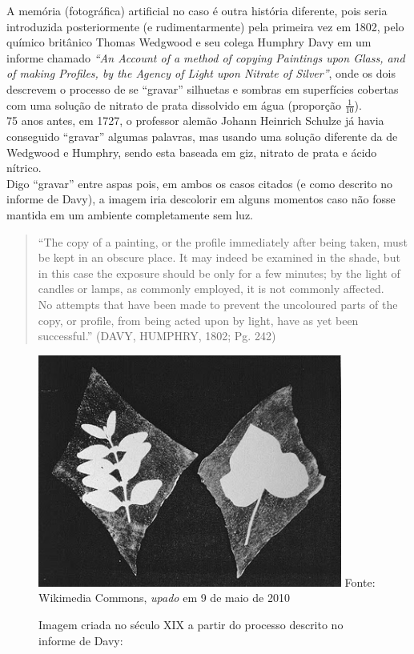 \documentclass[
  a4paper]{article}
\begin{document}
\newpage

A memória (fotográfica) artificial no caso é outra história diferente,
pois seria introduzida posteriormente (e rudimentarmente) pela primeira
vez em 1802, pelo químico britânico Thomas Wedgwood e seu colega Humphry
Davy em um informe chamado \emph{``An Account of a method of copying
Paintings upon Glass, and of making Profiles, by the Agency of Light
upon Nitrate of Silver''}, onde os dois descrevem o processo de se
``gravar'' silhuetas e sombras em superfícies cobertas com uma solução
de nitrato de prata dissolvido em água (proporção \(\frac{1}{10}\)).\\
75 anos antes, em 1727, o professor alemão Johann Heinrich Schulze já
havia conseguido ``gravar'' algumas palavras, mas usando uma solução
diferente da de Wedgwood e Humphry, sendo esta baseada em giz, nitrato
de prata e ácido nítrico.\\
Digo ``gravar'' entre aspas pois, em ambos os casos citados (e como
descrito no informe de Davy), a imagem iria descolorir em alguns
momentos caso não fosse mantida em um ambiente completamente sem luz.

\begin{quote}
``The copy of a painting, or the profile immediately after being taken,
must be kept in an obscure place. It may indeed be examined in the
shade, but in this case the exposure should be only for a few minutes;
by the light of candles or lamps, as commonly employed, it is not
commonly affected.\\
No attempts that have been made to prevent the uncoloured parts of the
copy, or profile, from being acted upon by light, have as yet been
successful.'' (DAVY, HUMPHRY, 1802; Pg. 242)
\end{quote}

\begin{figure}[!h]
\centering
    \caption{Imagem criada no século XIX a partir do processo descrito no informe de Davy:} 
    \includegraphics[width=100mm]{../_img/Facsimile-print_Thomas_Wedgwood.jpg}
    \linebreak
    Fonte: Wikimedia Commons, \textit{upado} em 9 de maio de 2010  
\end{figure}
\end{document}
